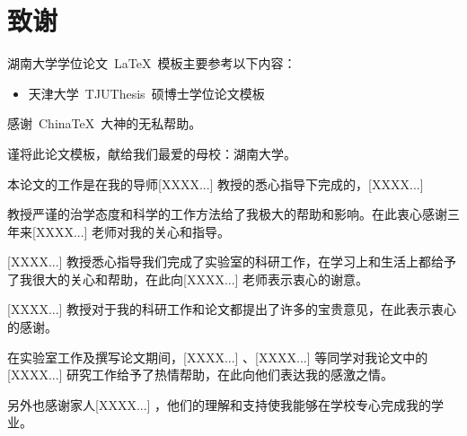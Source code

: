 \chapter*{致\quad 谢}

湖南大学学位论文~\LaTeX~模板主要参考以下内容：
\begin{itemize}
  \item 天津大学~TJUThesis~硕博士学位论文模板
 \end{itemize}

感谢~ChinaTeX~大神的无私帮助。

谨将此论文模板，献给我们最爱的母校：湖南大学。

\vspace*{1cm}
本论文的工作是在我的导师[XXXX...] 教授的悉心指导下完成的，[XXXX...]

教授严谨的治学态度和科学的工作方法给了我极大的帮助和影响。在此衷心感谢三年来[XXXX...] 老师对我的关心和指导。

[XXXX...] 教授悉心指导我们完成了实验室的科研工作，在学习上和生活上都给予了我很大的关心和帮助，在此向[XXXX...] 老师表示衷心的谢意。

[XXXX...] 教授对于我的科研工作和论文都提出了许多的宝贵意见，在此表示衷心的感谢。

在实验室工作及撰写论文期间，[XXXX...] 、[XXXX...] 等同学对我论文中的[XXXX...] 研究工作给予了热情帮助，在此向他们表达我的感激之情。

另外也感谢家人[XXXX...] ，他们的理解和支持使我能够在学校专心完成我的学业。



